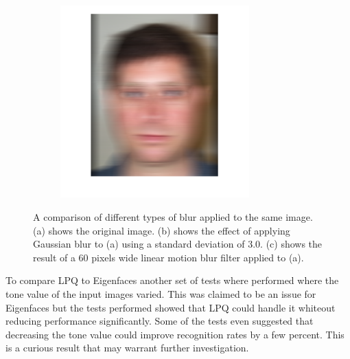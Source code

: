 \begin{figure}[H]
\begin{subfigure}{.30\textwidth}
  \includegraphics[width=0.8\textwidth]{img/blur_test/motion_img.png}
  \caption{}
\end{subfigure}%
\caption{A comparison of different types of blur applied to the same image. (a) shows the original image. (b) shows the effect of applying Gaussian blur to (a) using a standard deviation of 3.0. (c) shows the result of a 60 pixels wide linear motion blur filter applied to (a).}
\label{fig:fr_result_images}
\end{figure}

To compare LPQ to Eigenfaces another set of tests where performed where the tone value of the input images varied. This was claimed to be an issue for Eigenfaces but the tests performed showed that LPQ could handle it whiteout reducing performance significantly. Some of the tests even suggested that decreasing the tone value could improve recognition rates by a few percent. This is a curious result that may warrant further investigation.
